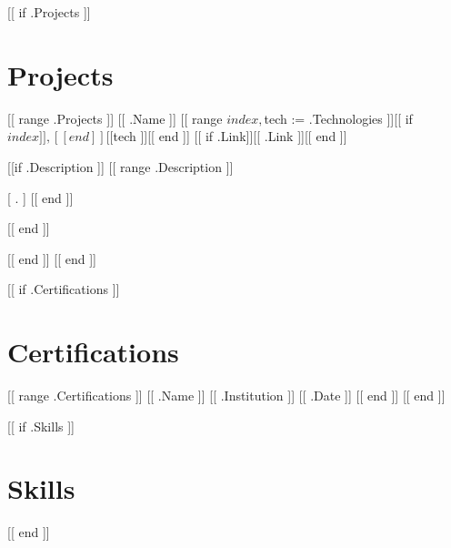 \documentclass[letterpaper]{resume_config}
\begin{document}
[[ if .Projects ]]
\section{Projects}
[[ range .Projects ]]
\Project
    {[[ .Name ]]}
    {[[ range $index, $tech := .Technologies ]][[ if $index ]], [[ end ]][[ $tech ]][[ end ]]}
    [[ if .Link]]{[[ .Link ]]}[[ end ]]
    {
        [[if .Description ]]
        [[ range .Description ]]
            \item [[ . ]]
        [[ end ]]
        }
[[ end ]]
\vspace{5pt}

[[ end ]]
[[ end ]]



[[ if .Certifications ]]
\section{Certifications}
[[ range .Certifications ]]
\Certification
    {[[ .Name ]]}
    {[[ .Institution ]]}
    {[[ .Date ]]}
[[ end ]]
[[ end ]]



[[ if .Skills ]]
\section{Skills}
[[ end ]]
\end{document}
